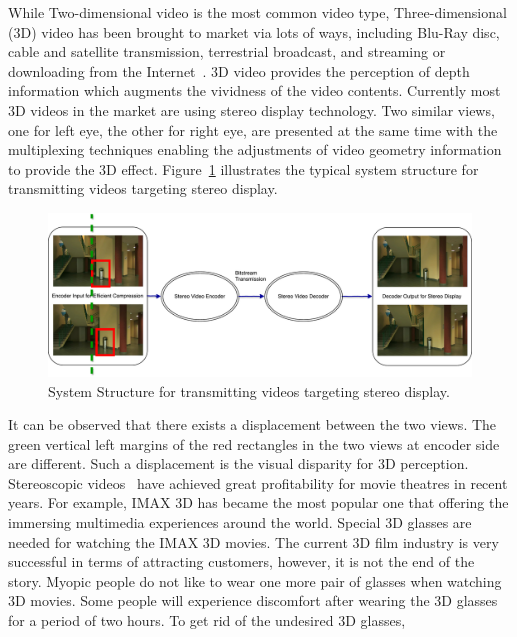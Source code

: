 While Two-dimensional video is the most common video type,
Three-dimensional (3D) video has been brought to market via lots of ways,
including Blu-Ray disc, cable and satellite transmission, terrestrial
broadcast, and streaming or downloading from the Internet~\parencite{RN118}.
3D video provides the perception of depth information which augments
the vividness of the video contents.
Currently most 3D videos in the market are using stereo display technology.
Two similar views, one for left eye, the other for right eye, are presented
at the same time with the multiplexing techniques enabling the
adjustments of video geometry information~\parencite{RN196} to provide
the 3D effect.
Figure~\ref{fig:stereo-display} illustrates the typical system structure for
transmitting videos targeting stereo display.
\begin{figure}
    \centering
    \includegraphics[width=\textwidth,height=\textheight,keepaspectratio]{Figures/StereoDisplay}
    \caption[System Structure for transmitting videos targeting stereo display]{System Structure for transmitting videos targeting stereo display.}
    \label{fig:stereo-display}
\end{figure}
It can be observed that there exists a displacement between the
two views.
The green vertical left margins of the red rectangles in the two views
at encoder side are different.
Such a displacement is the visual disparity for 3D perception.
Stereoscopic videos~\parencite{RN153} have
achieved great profitability for movie theatres in recent years.
For example, IMAX 3D has became the most popular one that offering
the immersing multimedia experiences around the world.
Special 3D glasses are needed for watching the IMAX 3D movies.
The current 3D film industry is very successful in terms of attracting
customers, however, it is not the end of the story.
Myopic people do not like to wear one more pair of glasses when
watching 3D movies.
Some people will experience discomfort after wearing the 3D glasses for a
period of two hours.
To get rid of the undesired 3D glasses,

